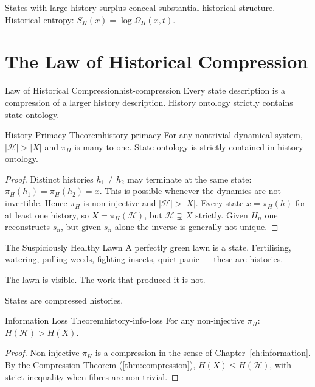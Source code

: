 \documentclass[12pt,twoside,openright]{book}
\newcommand{\hist}{\mathcal{H}}
\begin{document}
States with large history surplus conceal substantial
historical structure. Historical entropy:
$S_H(x) = \log\Omega_H(x,t)$.

\section{The Law of Historical Compression}
\label{sec:ch4-law}

\begin{law}{Law of Historical Compression}{hist-compression}
  Every state description is a compression of a larger
  history description. History ontology strictly contains
  state ontology.
\end{law}

\begin{theorem}{History Primacy Theorem}{history-primacy}
  For any nontrivial dynamical system,
  $|\hist| > |X|$ and $\pi_H$ is many-to-one.
  State ontology is strictly contained in history ontology.
\end{theorem}

\begin{proof}
  Distinct histories $h_1 \ne h_2$ may terminate at the
  same state: $\pi_H(h_1) = \pi_H(h_2) = x$. This is
  possible whenever the dynamics are not invertible.
  Hence $\pi_H$ is non-injective and $|\hist| > |X|$.
  Every state $x = \pi_H(h)$ for at least one history,
  so $X = \pi_H(\hist)$, but $\hist \supsetneq X$ strictly.
  Given $H_n$ one reconstructs $s_n$, but given $s_n$
  alone the inverse is generally not unique.
\end{proof}

\begin{distinctionaside}{The Suspiciously Healthy Lawn}
A perfectly green lawn is a state. Fertilising, watering,
pulling weeds, fighting insects, quiet panic — these are
histories.

The lawn is visible. The work that produced it is not.

States are compressed histories.
\end{distinctionaside}

\begin{theorem}{Information Loss Theorem}{history-info-loss}
  For any non-injective $\pi_H$: $H(\hist) > H(X)$.
\end{theorem}

\begin{proof}
  Non-injective $\pi_H$ is a compression in the sense of
  Chapter~\ref{ch:information}. By the Compression Theorem
  (\cref{thm:compression}), $H(X) \le H(\hist)$, with
  strict inequality when fibres are non-trivial.
\end{proof}
\end{document}
